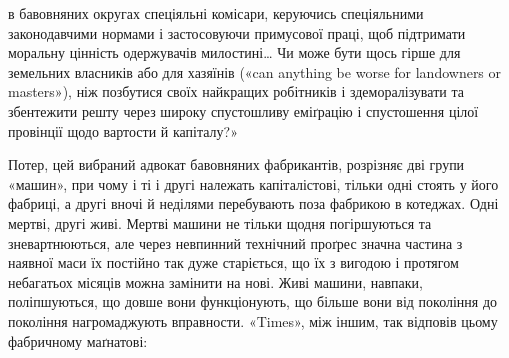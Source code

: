 \parcont{}  %
в бавовняних округах спеціяльні комісари, керуючись спеціяльними
законодавчими нормами і застосовуючи примусової праці,
щоб підтримати моральну цінність одержувачів милостині\dots{}
Чи може бути щось гірше для земельних власників або для хазяїнів
(«can anything be worse for landowners or masters»), ніж
позбутися своїх найкращих робітників і здеморалізувати та
збентежити решту через широку спустошливу еміґрацію і спустошення
цілої провінції щодо вартости й капіталу?»

Потер, цей вибраний адвокат бавовняних фабрикантів, розрізняє
дві групи «машин», при чому і ті і другі належать капіталістові,
тільки одні стоять у його фабриці, а другі вночі й
неділями перебувають поза фабрикою в котеджах. Одні мертві,
другі живі. Мертві машини не тільки щодня погіршуються та
зневартнюються, але через невпинний технічний проґрес значна
частина з наявної маси їх постійно так дуже старіється, що їх
з вигодою і протягом небагатьох місяців можна замінити на нові.
Живі машини, навпаки, поліпшуються, що довше вони функціонують,
що більше вони від покоління до покоління нагромаджують
вправности. «Times», між іншим, так відповів цьому
фабричному маґнатові:


